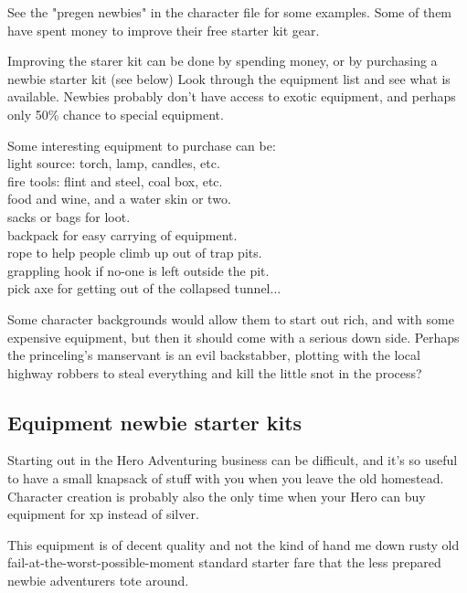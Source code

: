 See the "pregen newbies" in the character file for some examples. Some of them have spent money to improve their free starter kit gear.


Improving the starer kit can be done by spending money, or by purchasing a newbie starter kit (see below) Look through the equipment list and see what is available. Newbies probably don't have access to exotic equipment, and perhaps only 50\% chance to special equipment.

Some interesting equipment to purchase can be: \\
light source: torch, lamp, candles, etc. \\
fire tools: flint and steel, coal box, etc. \\
food and wine, and a water skin or two. \\
sacks or bags for loot. \\
backpack for easy carrying of equipment. \\
rope to help people climb up out of trap pits. \\
grappling hook if no-one is left outside the pit. \\
pick axe for getting out of the collapsed tunnel...

Some character backgrounds would allow them to start out rich, and with some expensive equipment, but then it should come with a serious down side. Perhaps the princeling's manservant is an evil backstabber, plotting with the local highway robbers to steal everything and kill the little snot in the process?


\subsection*{Equipment newbie starter kits}
Starting out in the Hero Adventuring business can be difficult, and it's so useful to have a small knapsack of stuff with you when you leave the old homestead. Character creation is probably also the only time when your Hero can buy equipment for xp instead of silver.

This equipment is of decent quality and not the kind of hand me down rusty old fail-at-the-worst-possible-moment standard starter fare that the less prepared newbie adventurers tote around.

\

